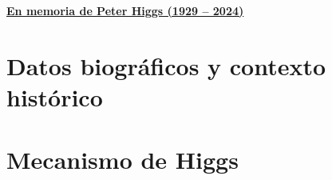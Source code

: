 \documentclass[12pt]{article}
\begin{document}
\begin{center}

{\Large{\underline{\bf En memoria de Peter Higgs (1929 -- 2024)}}} \vspace*{2mm} \\

\end{center}

\noindent


\section{Datos biogr\'aficos y contexto hist\'orico}



\section{Mecanismo de Higgs}




\end{document}
